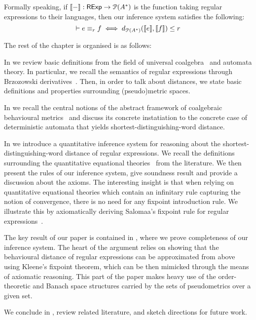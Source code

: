 Formally speaking, if $\left\llbracket{-}\right\rrbracket: \mathsf{RExp} \to \mathcal{P} ({A}^*)$ is the function taking regular expressions to their languages, then our inference system satisfies the following:
$$
	\vdash e \equiv_r f \iff d_{\mathcal{P}({A}^{\ast})}(\llbracket e \rrbracket, \llbracket f \rrbracket) \leq r
$$ 

The rest of the chapter is organised is as follows:

In  we review basic definitions from the field of universal coalgebra~\cite{Rutten:2000:Universal,Gumm:2000:Elements} and automata theory. In particular, we recall the semantics of regular expressions through Brzozowski derivatives~\cite{Brzozowski:1964:Expressions}. Then, in order to talk about distances, we state basic definitions and properties surrounding (pseudo)metric spaces.

In  we recall the central notions of the abstract framework of coalgebraic behavioural metrics~\cite{Baldan:2018:Coalgebraic} and discuss its concrete instatiation to the concrete case of deterministic automata that yields shortest-distinguishing-word distance.
	
In  we introduce a quantitative inference system for reasoning about the shortest-distinguishing-word distance of regular expressions. We recall the definitions surrounding the quantitative equational theories~\cite{Mardare:2016:Quantitative} from the literature. We then present the rules of our inference system, give soundness result and provide a discussion about the axioms. The interesting insight is that when relying on quantitative equational theories which contain an infinitary rule capturing the notion of convergence, there is no need for any fixpoint introduction rule. We illustrate this by axiomatically deriving Salomaa's fixpoint rule for regular expressions~\cite{Salomaa:1966:Two}.

The key result of our paper is contained in , where we prove completeness of our inference system. The heart of the argument relies on showing that the behavioural distance of regular expressions can be approximated from above using Kleene's fixpoint theorem, which can be then mimicked through the means of axiomatic reasoning. This part of the paper makes heavy use of the order-theoretic and Banach space structures carried by the sets of pseudometrics over a given set.

We conclude in , review related literature, and sketch directions for future work.

